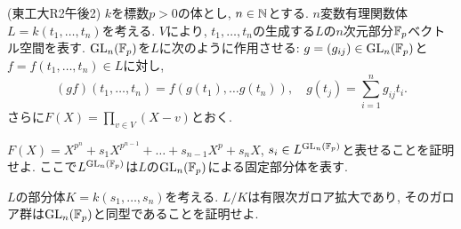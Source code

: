 \begin{egprob} (東工大R2午後2)
$k$を標数$p>0$の体とし, $n\in\mathbb{N}$とする. $n$変数有理関数体$L=k(t_1,\dots, t_n)$を考える. $V$により, $t_1,\dots, t_n$の生成する$L$の$n$次元部分$\mathbb{F}_{p}$ベクトル空間を表す. $\mathrm{GL}_n(\mathbb{F}_{p})$を$L$に次のように作用させる: $g=(g_{ij})\in \mathrm{GL}_{n}(\mathbb{F}_p)$と$f=f(t_1,\dots, t_n)\in L$に対し,
\[(gf)(t_1,\dots, t_n) = f(g(t_1), \dots g(t_n)),\quad g(t_j) = \sum_{i=1}^{n} g_{ij}t_i.\]
さらに$F(X) = \prod_{v\in V} (X-v)$とおく.
\ben
\item $F(X) = X^{p^n} + s_1 X^{p^{n-1}} + \dots + s_{n-1}X^p + s_n X$, $s_i \in L^{\mathrm{GL}_{n}(\mathbb{F}_p)}$と表せることを証明せよ. ここで$L^{\mathrm{GL}_{n}(\mathbb{F}_{p})}$は$L$の$\mathrm{GL}_{n}(\mathbb{F}_p)$による固定部分体を表す.
\item $L$の部分体$K=k(s_1,\dots, s_n)$を考える. $L/K$は有限次ガロア拡大であり, そのガロア群は$\mathrm{GL}_{n}(\mathbb{F}_{p})$と同型であることを証明せよ.
\een
\end{egprob}

